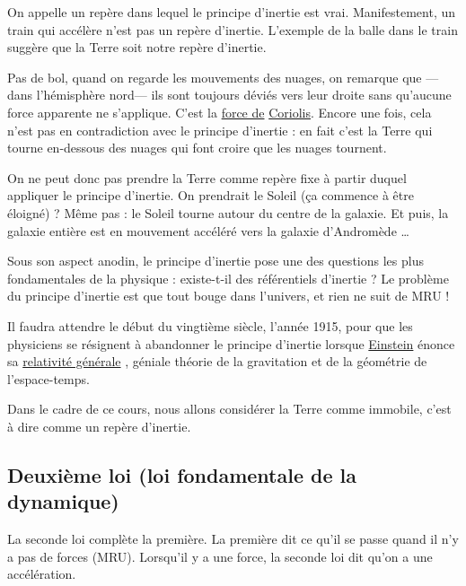 On appelle  un repère dans lequel le principe d'inertie est vrai. Manifestement, un train qui accélère n'est pas un repère d'inertie. L'exemple de la balle dans le train suggère que la Terre soit notre repère d'inertie.

Pas de bol, quand on regarde les mouvements des nuages, on remarque que ---dans l'hémisphère nord--- ils sont toujours déviés vers leur droite sans qu'aucune force apparente ne s'applique. C'est la \href{http://fr.wikipedia.org/wiki/Force\_de\_Coriolis}{force de} \href{http://fr.wikipedia.org/wiki/Gaspard-Gustave\_Coriolis}{Coriolis}. Encore une fois, cela n'est pas en contradiction avec le principe d'inertie : en fait c'est la Terre qui tourne en-dessous des nuages qui font croire que les nuages tournent.

On ne peut donc pas prendre la Terre comme repère fixe à partir duquel appliquer le principe d'inertie. On prendrait le Soleil (ça commence à être éloigné) ? Même pas : le Soleil tourne autour du centre de la galaxie. Et puis, la galaxie entière est en mouvement accéléré vers la galaxie d'Andromède \ldots

Sous son aspect anodin, le principe d'inertie pose une des questions les plus fondamentales de la physique : existe-t-il des référentiels d'inertie ? Le problème du principe d'inertie est que tout bouge dans l'univers, et rien ne suit de MRU !

 Il faudra attendre le début du vingtième siècle, l'année 1915, pour que les physiciens se résignent à abandonner le principe d'inertie lorsque \href{http://fr.wikipedia.org/wiki/Einstein}{Einstein} énonce sa \href{http://fr.wikipedia.org/wiki/Relativité\_générale}{relativité générale} , géniale théorie de la gravitation et de la géométrie de l'espace-temps.

Dans le cadre de ce cours, nous allons considérer la Terre comme immobile, c'est à dire comme un repère d'inertie.

\subsection{Deuxième loi (loi fondamentale de la dynamique)}

La seconde loi complète la première. La première dit ce qu'il se passe quand il n'y a pas de forces (MRU). Lorsqu'il y a une force, la seconde loi dit qu'on a une accélération.

